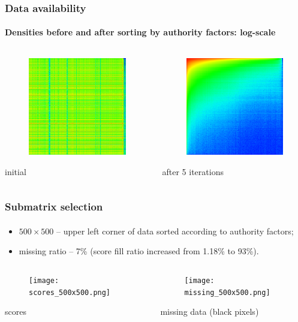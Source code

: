 \documentclass{beamer}
\begin{document}
\begin{frame}
\frametitle{Data availability}
\framesubtitle{Densities before and after sorting by authority factors:
log-scale}
\begin{columns}[T] %
\begin{column}{.48\textwidth}
\begin{figure}[h] 
    \includegraphics[width=5cm]{log_0.png}
\end{figure}
initial
\end{column}%
\hfill%
\begin{column}{.48\textwidth}
\begin{figure}[h] 
    \includegraphics[width=5cm]{log_5.png}
\end{figure}
after 5 iterations
\end{column}%
\end{columns}
\end{frame}

\begin{frame}
\frametitle{Submatrix selection}
\framesubtitle{}
\begin{itemize}
  \item $500 \times 500$ -- upper left corner of data sorted according to
  authority factors;
  \item missing ratio -- 7\% (score fill ratio increased from 1.18\% to 93\%).
\end{itemize}
\begin{columns}[T] %
\begin{column}{.48\textwidth}
\begin{figure}[h] 
    \texttt{[image: scores\_500x500.png]}
\end{figure}
scores
\end{column}%
\hfill%
\begin{column}{.48\textwidth}
\begin{figure}[h] 
    \texttt{[image: missing\_500x500.png]}
\end{figure}
missing data (black pixels)
\end{column}%
\end{columns}
\end{frame}
\end{document}
